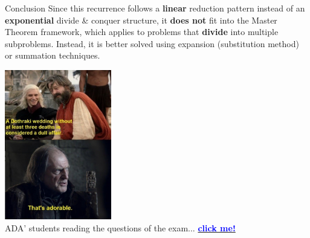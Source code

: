 \documentclass{beamer}
\begin{document}
\begin{frame}{Conclusion}
    Since this recurrence follows a \textbf{linear} reduction pattern instead of an \textbf{exponential} divide \& conquer structure, it \textbf{does not} fit into the Master Theorem framework, which applies to problems that \textbf{divide} into multiple subproblems. Instead, it is better solved using expansion (substitution method) or summation techniques.
\end{frame}

\begin{frame}{ }
    \centering
    \includegraphics[width=0.35\textwidth]{figures/red_wedding.jpeg} \\
    ADA' students reading the questions of the exam... \href{https://youtu.be/TZZpdHMo4UQ?si=RGrIhu2Hzv55pb5d}{\textcolor{blue}{\textbf{click me!}}}
\end{frame}
\end{document}
